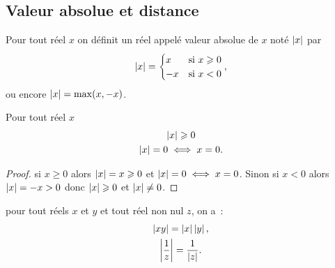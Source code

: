 \subsection{Valeur absolue et distance}

\begin{defdef}
  Pour tout réel \(x\) on définit un réel appelé valeur absolue de \(x\) noté
  \(\left\lvert x\right\rvert\) par
  \begin{equation}
    \left\lvert x\right\rvert = \begin{cases} x & \text{si } x\geqslant 0 \\ -x & \text{si } x < 0
    \end{cases},
    \end{equation}
    ou encore \(\left\lvert x\right\rvert = \max(x, - x)\).
  \end{defdef}

  \begin{prop}
    Pour tout réel \(x\)
    \begin{gather}
      \left\lvert x\right\rvert\geqslant 0 \\
      \left\lvert x\right\rvert = 0 \iff x = 0.
    \end{gather}
  \end{prop}

  \begin{proof}
    si \(x \geqslant 0\) alors \(\left\lvert x\right\rvert = x \geqslant 0\) et \(\left\lvert x\right\rvert = 0 \iff
    x = 0\). Sinon si \(x < 0\) alors \(\left\lvert x\right\rvert = -x>0\) donc \(\left\lvert x\right\rvert
    \geqslant 0\) et \(\left\lvert x\right\rvert \neq 0\).
  \end{proof}

  \begin{prop}
    pour tout réels \(x\) et \(y\) et tout réel non nul \(z\), on a~:
    \begin{gather}
      \left\lvert xy\right\rvert = \left\lvert x\right\rvert\left\lvert y\right\rvert, \\ \left\lvert\frac{1}{z}\right\rvert = \frac{1}{\left\lvert z\right\rvert}.
    \end{gather}
  \end{prop}

